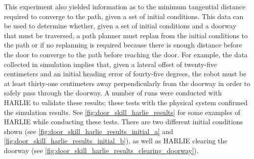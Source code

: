 This experiment also yielded information as to the minimum tangential distance required to converge to the path, given a set of initial conditions. This data can be used to determine whether, given a set of initial conditions and a doorway that must be traversed, a path planner must replan from the initial conditions to the path or if no replanning is required because there is enough distance before the door to converge to the path before reaching the door. For example, the data collected in simulation implies that, given a lateral offset of twenty-five centimeters and an initial heading error of fourty-five degrees, the robot must be at least thirty-one centimeters away perpendicularly from the doorway in order to safely pass through the doorway. A number of runs were conducted with HARLIE to validate these results; these tests with the physical system confirmed the simulation results. See \autoref{fig:door_skill_harlie_results} for some examples of HARLIE while conducting these tests.  There are two different initial conditions shown (see \autoref{fig:door_skill_harlie_results_initial_a} and \autoref{fig:door_skill_harlie_results_initial_b}), as well as HARLIE clearing the doorway (see \autoref{fig:door_skill_harlie_results_clearing_doorway}).

